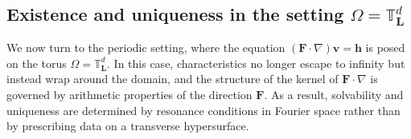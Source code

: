 \documentclass[12pt]{article}
\newtheorem{lemma}{Lemma}
\begin{document}
        
        

        
		






\subsection{Existence and uniqueness in the setting $\Omega = \mathbb{T}^d_{\boldsymbol{L}}$}\label{sec:zeromeanperiodictransport}
We now turn to the periodic setting, where the equation ${{} (\mathbf F\cdot\nabla)\boldsymbol v=\boldsymbol h}$ is posed on the torus $\Omega =\mathbb{T}^d_{\boldsymbol{L}}$. In this case, characteristics no longer escape to infinity but instead wrap around the domain, and the structure of the kernel of $\mathbf F\cdot\nabla$ is governed by arithmetic properties of the direction $\mathbf F$. As a result, solvability and uniqueness are determined by resonance conditions in Fourier space rather than by prescribing data on a transverse hypersurface.        
 
\end{document}
